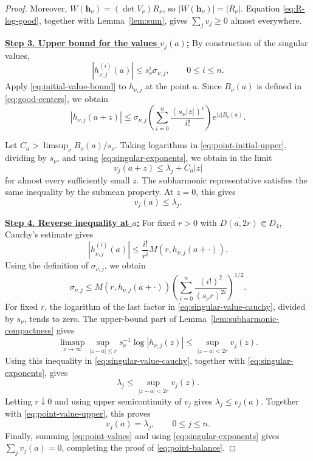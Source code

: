 \documentclass[12pt,letterpaper,reqno]{amsart}
\theoremstyle{definition}
\numberwithin{equation}{section}
\newcommand{\hv}{\bm h}
\begin{document}
\begin{proof}
Moreover,
\(W(\hv_\nu)=(\det V_\nu)R_\nu\), so
\(|W(\hv_\nu)|=|R_\nu|\). Equation
\eqref{eq:R-log-good}, together with Lemma~\ref{lem:sum}, gives
\(\sum_jv_j\geq0\) almost everywhere.


\medskip\noindent
\textbf{\underline{Step 3. Upper bound for the values \(v_j(a)\):}}
By construction of the singular values,
\[
|h_{\nu,j}^{(i)}(a)|
\leq
s_\nu^i\sigma_{\nu,j},
\qquad
0\leq i\leq n.
\]
Apply \eqref{eq:initial-value-bound} to \(h_{\nu,j}\) at the point
\(a\). Since \(B_\nu(a)\) is defined in
\eqref{eq:good-centers}, we obtain
\begin{equation}\label{eq:point-initial-upper}
 |h_{\nu,j}(a+z)|
 \leq
 \sigma_{\nu,j}
 \left(
 \sum_{i=0}^{n}
 \frac{(s_\nu|z|)^i}{i!}
 \right)
 e^{|z|B_\nu(a)}.
\end{equation}

Let
\(C_a>\limsup_\nu B_\nu(a)/s_\nu\).
Taking logarithms in \eqref{eq:point-initial-upper}, dividing by
\(s_\nu\), and using \eqref{eq:singular-exponents}, we obtain in the
limit
\[
v_j(a+z)\leq\lambda_j+C_a|z|
\]
for almost every sufficiently small \(z\). The subharmonic
representative satisfies the same inequality by the submean property.
At \(z=0\), this gives
\begin{equation}\label{eq:point-value-upper}
 v_j(a)\leq\lambda_j.
\end{equation}


\medskip\noindent
\textbf{\underline{Step 4. Reverse inequality at \(a\):}}
For fixed \(r>0\) with
\(\overline{D(a,2r)}\Subset D_4\), Cauchy's estimate gives
\[
|h_{\nu,j}^{(i)}(a)|
\leq
\frac{i!}{r^i}
M(r,h_{\nu,j}(a+\cdot)).
\]
Using the definition of \(\sigma_{\nu,j}\), we obtain
\begin{equation}\label{eq:singular-value-cauchy}
 \sigma_{\nu,j}
 \leq
 M(r,h_{\nu,j}(a+\cdot))
 \left(
 \sum_{i=0}^{n}
 \frac{(i!)^2}{(s_\nu r)^{2i}}
 \right)^{1/2}.
\end{equation}
For fixed \(r\), the logarithm of the last factor in
\eqref{eq:singular-value-cauchy}, divided by \(s_\nu\), tends to zero.
The upper-bound part of
Lemma~\ref{lem:subharmonic-compactness} gives
\[
\limsup_{\nu\to\infty}
\sup_{|z-a|\leq r}
s_\nu^{-1}\log|h_{\nu,j}(z)|
\leq
\sup_{|z-a|<2r}v_j(z).
\]
Using this inequality in \eqref{eq:singular-value-cauchy}, together
with \eqref{eq:singular-exponents}, gives
\[
\lambda_j
\leq
\sup_{|z-a|<2r}v_j(z).
\]
Letting \(r\downarrow0\) and using upper semicontinuity of \(v_j\)
gives \(\lambda_j\leq v_j(a)\). Together with
\eqref{eq:point-value-upper}, this proves
\begin{equation}\label{eq:point-values}
 v_j(a)=\lambda_j,
 \qquad
 0\leq j\leq n.
\end{equation}
Finally, summing \eqref{eq:point-values} and using
\eqref{eq:singular-exponents} gives
\(\sum_jv_j(a)=0\), completing the proof of
\eqref{eq:point-balance}.
\end{proof}
\end{document}
